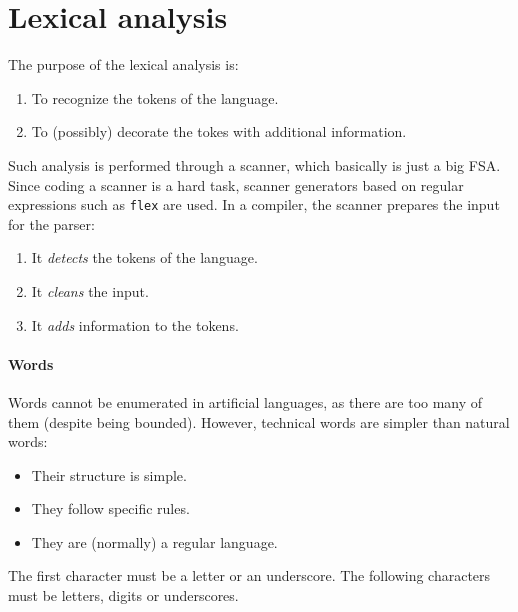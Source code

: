 \section{Lexical analysis}

The purpose of the lexical analysis is:
\begin{enumerate}
    \item To recognize the tokens of the language.
    \item To (possibly) decorate the tokes with additional information.
\end{enumerate}
Such analysis is performed through a scanner, which basically is just a big FSA.
Since coding a scanner is a hard task, scanner generators based on regular expressions such as \texttt{flex} are used.
In a compiler, the scanner prepares the input for the parser:
\begin{enumerate}
    \item It \textit{detects} the tokens of the language.
    \item It \textit{cleans} the input.
    \item It \textit{adds} information to the tokens.
\end{enumerate}

\paragraph*{Words}
Words cannot be enumerated in artificial languages, as there are too many of them (despite being bounded).
However, technical words are simpler than natural words:
\begin{itemize}
    \item Their structure is simple.
    \item They follow specific rules.
    \item They are (normally) a regular language.
\end{itemize}
\begin{property}
    The first character must be a letter or an underscore. 
    The following characters must be letters, digits or underscores. 
\end{property}